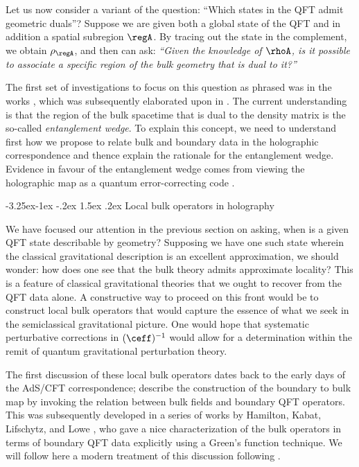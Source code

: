 \documentclass[12pt,openany]{book}
\makeatletter
\renewcommand\subsection{\@startsection{subsection}{2}{\z@}%
                                     {-3.25ex\@plus -1ex \@minus -.2ex}%
                                     {1.5ex \@plus .2ex}%
                                     {\normalfont\bfseries}}
\makeatother
\begin{document}
Let us now consider a variant of the question: ``Which states in the QFT admit geometric duals''? Suppose we are given both a global state of the QFT and in addition a spatial subregion $\regA$. By tracing out the state in the complement, we obtain $\rho_\regA$, and then can ask: \emph{``Given the knowledge of $\rhoA$, is it possible to associate a specific region of the bulk geometry that is dual to it?''}

The first set of investigations to focus on this question as phrased was in the works  \cite{Bousso:2012sj,Czech:2012bh}, which was subsequently elaborated upon in \cite{Wall:2012uf,Headrick:2014cta}. The current understanding is that the region of the bulk spacetime that is dual to the density matrix is the so-called \emph{entanglement wedge}. To explain this concept, we need to understand first how we propose to relate bulk and boundary data in the holographic correspondence and thence explain the rationale for the entanglement wedge. Evidence in favour of the entanglement wedge comes from viewing the holographic map as a quantum
error-correcting code \cite{Dong:2016eik}.

\subsection{Local bulk operators in holography}
\label{sec:hkll}

We have focused our attention in the previous section on asking, when is a given QFT state describable by geometry? Supposing we have one such state wherein the classical gravitational description is an excellent approximation, we should wonder: how does one see that the bulk theory admits approximate locality? This is a feature of classical gravitational theories that we ought to recover from the QFT data alone. A constructive way to proceed on this front would be to construct local bulk operators that would capture the essence of what we seek in the semiclassical gravitational picture. One would  hope that systematic perturbative corrections in $(\ceff)^{-1}$ would allow for a determination within the remit of quantum gravitational perturbation theory.

The first discussion of these local bulk operators dates back to the early days of the AdS/CFT correspondence; \cite{Banks:1998dd} describe the construction of the boundary to bulk map by invoking the relation between bulk fields and boundary QFT operators. This was subsequently developed in a series of works by Hamilton, Kabat, Lifschytz, and Lowe \cite{Hamilton:2005ju,Hamilton:2006az,Hamilton:2006fh}, who gave a nice characterization of the bulk operators in terms of boundary QFT data explicitly using a Green's function technique. We will follow here a modern treatment of  this discussion following \cite{Heemskerk:2012mn}.
\end{document}
